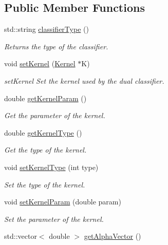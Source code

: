 \subsection*{Public Member Functions}
\begin{DoxyCompactItemize}
\item 
std\+::string \hyperlink{class_dual_classifier_af1217d4b44e417817a25157bb3f9b6d9}{classifier\+Type} ()
\begin{DoxyCompactList}\small\item\em Returns the type of the classifier. \end{DoxyCompactList}\item 
void \hyperlink{class_dual_classifier_a4f4cc830f9f9723592dc92957aec5d48}{set\+Kernel} (\hyperlink{class_kernel}{Kernel} $\ast$K)
\begin{DoxyCompactList}\small\item\em set\+Kernel Set the kernel used by the dual classifier. \end{DoxyCompactList}\item 
double \hyperlink{class_dual_classifier_ad5cc383587a3388bfc370879d76b8cf6}{get\+Kernel\+Param} ()
\begin{DoxyCompactList}\small\item\em Get the parameter of the kernel. \end{DoxyCompactList}\item 
double \hyperlink{class_dual_classifier_ae15bdcaa9b46e1084aa2df7170a0217f}{get\+Kernel\+Type} ()
\begin{DoxyCompactList}\small\item\em Get the type of the kernel. \end{DoxyCompactList}\item 
void \hyperlink{class_dual_classifier_abe138aa8f388a11475773155961911be}{set\+Kernel\+Type} (int type)
\begin{DoxyCompactList}\small\item\em Set the type of the kernel. \end{DoxyCompactList}\item 
void \hyperlink{class_dual_classifier_a1eaa47dfe556a9c0ecb05cd82324c337}{set\+Kernel\+Param} (double param)
\begin{DoxyCompactList}\small\item\em Set the parameter of the kernel. \end{DoxyCompactList}\item 
std\+::vector$<$ double $>$ \hyperlink{class_dual_classifier_a9ce7228ddbdf6886782e2d1abf9bb0a9}{get\+Alpha\+Vector} ()

\end{DoxyCompactItemize}
